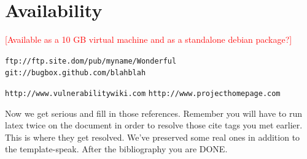 \documentclass[letterpaper,twocolumn,10pt]{article}
\begin{document}
\section{Availability}
\textcolor{red}{
[Available as a 10 GB virtual machine and as a standalone debian package?]
}
\begin{center}
{\tt ftp://ftp.site.dom/pub/myname/Wonderful}
{\tt git://bugbox.github.com/blahblah}
\end{center}

\begin{center}
{\tt http://www.vulnerabilitywiki.com}
{\tt http://www.projecthomepage.com}
\end{center}

Now we get serious and fill in those references.  Remember you will
have to run latex twice on the document in order to resolve those
cite tags you met earlier.  This is where they get resolved.
We've preserved some real ones in addition to the template-speak.
After the bibliography you are DONE.

{\footnotesize 
}


\end{document}
